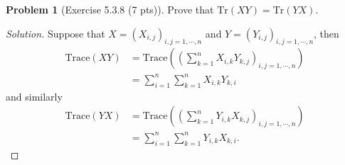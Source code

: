 \documentclass{article}
\theoremstyle{definition}
\newtheorem{problem}{Problem}
\theoremstyle{plain}
\begin{document}
\begin{problem}[Exercise 5.3.8 (7 pts)]
Prove that $\mathrm{Tr}(XY)=\mathrm{Tr}(YX)$.
\end{problem}
\begin{adjustwidth}{0.7cm}{}
\color{blue}
\begin{proof}[Solution]
Suppose that $X=(X_{i,j})_{i,j=1,\cdots,n}$ and $Y=(Y_{i,j})_{i,j=1,\cdots,n}$, then
\begin{align*}
\mathrm{Trace}(XY)&=\mathrm{Trace}\left(\left(\sum_{k=1}^{n}X_{i,k}Y_{k,j}\right)_{i,j=1,\cdots,n}\right)\\
&=\sum_{i=1}^{n}\sum_{k=1}^{n}X_{i,k}Y_{k,i}
\end{align*}
and similarly
\begin{align*}
\mathrm{Trace}(YX)&=\mathrm{Trace}\left(\left(\sum_{k=1}^{n}Y_{i,k}X_{k,j}\right)_{i,j=1,\cdots,n}\right)\\
&=\sum_{i=1}^{n}\sum_{k=1}^{n}Y_{i,k}X_{k,i}.
\end{align*}
\color{black}
\end{proof}
\end{adjustwidth}
\end{document}
